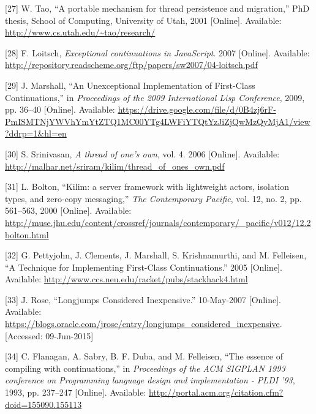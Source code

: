 \documentclass[12pt,a4paper,oneside,openright]{book}
\begin{document}
{
{[}27{]} W. Tao, ``A portable mechanism for thread persistence and
migration,'' PhD thesis, School of Computing, University of Utah, 2001
{[}Online{]}. Available: \url{http://www.cs.utah.edu/~tao/research/}

{[}28{]} F. Loitsch, \emph{Exceptional continuations in JavaScript}.
2007 {[}Online{]}. Available:
\url{http://repository.readscheme.org/ftp/papers/sw2007/04-loitsch.pdf}

{[}29{]} J. Marshall, ``An Unexceptional Implementation of First-Class
Continuations,'' in \emph{Proceedings of the 2009 International Lisp
Conference}, 2009, pp. 36--40 {[}Online{]}. Available:
\url{https://drive.google.com/file/d/0B4zj6rF-PmISMTNjYWVhYmYtZTQ1MC00YTg4LWFiYTQtYzJiZjQwMzQyMjA1/view?ddrp=1\&hl=en}

{[}30{]} S. Srinivasan, \emph{A thread of one's own}, vol. 4. 2006
{[}Online{]}. Available:
\url{http://malhar.net/sriram/kilim/thread_of_ones_own.pdf}

{[}31{]} L. Bolton, ``Kilim: a server framework with lightweight actors,
isolation types, and zero-copy messaging,'' \emph{The Contemporary
Pacific}, vol. 12, no. 2, pp. 561--563, 2000 {[}Online{]}. Available:
\url{http://muse.jhu.edu/content/crossref/journals/contemporary/_pacific/v012/12.2bolton.html}

{[}32{]} G. Pettyjohn, J. Clements, J. Marshall, S. Krishnamurthi, and
M. Felleisen, ``A Technique for Implementing First-Class
Continuations.'' 2005 {[}Online{]}. Available:
\url{http://www.ccs.neu.edu/racket/pubs/stackhack4.html}

{[}33{]} J. Rose, ``Longjumps Considered Inexpensive.'' 10-May-2007
{[}Online{]}. Available:
\url{https://blogs.oracle.com/jrose/entry/longjumps_considered_inexpensive}.
{[}Accessed: 09-Jun-2015{]}

{[}34{]} C. Flanagan, A. Sabry, B. F. Duba, and M. Felleisen, ``The
essence of compiling with continuations,'' in \emph{Proceedings of the
ACM SIGPLAN 1993 conference on Programming language design and
implementation - PLDI '93}, 1993, pp. 237--247 {[}Online{]}. Available:
\url{http://portal.acm.org/citation.cfm?doid=155090.155113}

}
\end{document}
